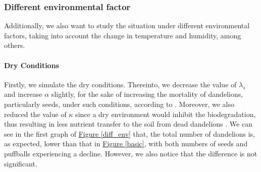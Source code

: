 \documentclass[12pt]{article}
\begin{document}
\subsubsection{Different environmental factor}
Additionally, we also want to study the situation under different environmental factors, taking into account the change in temperature and humidity, among others.

\paragraph{Dry Conditions} Firstly, we simulate the dry conditions. Thereinto, we decrease the value of \(\lambda_s\) and increase \(\alpha\) slightly, for the sake of increasing the mortality of dandelions, particularly seeds, under such conditions, according to \cite{wigg_dandelion_nodate}. Moreover, we also reduced the value of \(\kappa\) since a dry environment would inhibit the biodegradation, thus resulting in less nutrient transfer to the soil from dead dandelions \cite{joly_resolving_2023}. We can see in the first graph of \hyperref[diff_env]{Figure \ref*{diff_env}} that, the total number of dandelions is, as expected, lower than that in \hyperref[basic]{Figure \ref*{basic}}, with both numbers of seeds and puffballs experiencing a decline. However, we also notice that the difference is not significant.
\end{document}
